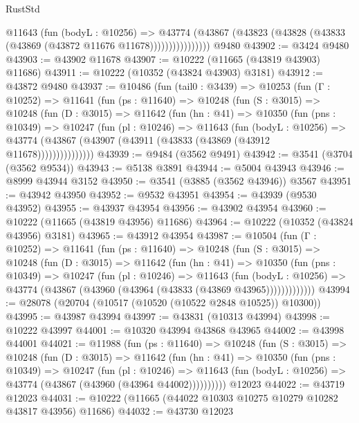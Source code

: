 \begin{lexlean}{RustStd}
\begin{coremodule}
                    @11643
                      (fun (bodyL : @10256) =>
                      @43774
                        (@43867
                          (@43823 (@43828 (@43833 (@43869 (@43872 @11676 @11678))))))))))))))))
    @9480
@43902 := @3424 @9480
@43903 := @43902 @11678
@43907 := @10222 (@11665 (@43819 @43903) @11686)
@43911 := @10222 (@10352 (@43824 @43903) @3181)
@43912 := @43872 @9480
@43937 := @10486
    (fun (tail0 : @3439) =>
    @10253
      (fun (Γ : @10252) =>
      @11641
        (fun (ps : @11640) =>
        @10248
          (fun (S : @3015) =>
          @10248
            (fun (D : @3015) =>
            @11642
              (fun (hn : @41) =>
              @10350
                (fun (pns : @10349) =>
                @10247
                  (fun (pl : @10246) =>
                  @11643
                    (fun (bodyL : @10256) =>
                    @43774 (@43867 (@43907 (@43911 (@43833 (@43869 (@43912 @11678)))))))))))))))
@43939 := @9484 (@3562 @9491)
@43942 := @3541 (@3704 (@3562 @9534))
@43943 := @5138 @3891
@43944 := @5004 @43943
@43946 := @8999 @43944 @3152
@43950 := @3541 (@3885 (@3562 @43946)) @3567
@43951 := @43942 @43950
@43952 := @9532 @43951
@43954 := @43939 (@9530 @43952)
@43955 := @43937 @43954
@43956 := @43902 @43954
@43960 := @10222 (@11665 (@43819 @43956) @11686)
@43964 := @10222 (@10352 (@43824 @43956) @3181)
@43965 := @43912 @43954
@43987 := @10504
    (fun (Γ : @10252) =>
    @11641
      (fun (ps : @11640) =>
      @10248
        (fun (S : @3015) =>
        @10248
          (fun (D : @3015) =>
          @11642
            (fun (hn : @41) =>
            @10350
              (fun (pns : @10349) =>
              @10247
                (fun (pl : @10246) =>
                @11643
                  (fun (bodyL : @10256) =>
                  @43774 (@43867 (@43960 (@43964 (@43833 (@43869 @43965)))))))))))))
@43994 := @28078 (@20704 (@10517 (@10520 (@10522 @2848 @10525)) @10300))
@43995 := @43987 @43994
@43997 := @43831 (@10313 @43994)
@43998 := @10222 @43997
@44001 := @10320 @43994 @43868 @43965
@44002 := @43998 @44001
@44021 := @11988
    (fun (ps : @11640) =>
    @10248
      (fun (S : @3015) =>
      @10248
        (fun (D : @3015) =>
        @11642
          (fun (hn : @41) =>
          @10350
            (fun (pns : @10349) =>
            @10247
              (fun (pl : @10246) =>
              @11643 (fun (bodyL : @10256) => @43774 (@43867 (@43960 (@43964 @44002))))))))))
    @12023
@44022 := @43719 @12023
@44031 := @10222 (@11665 (@44022 @10303 @10275 @10279 @10282 @43817 @43956) @11686)
@44032 := @43730 @12023

\end{coremodule}
\end{lexlean}
